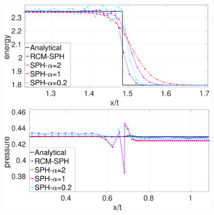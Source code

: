 \begin{figure}
\begin{minipage}{.495 \textwidth}
    \end{minipage}%
    \\
    \begin{minipage}{.495 \textwidth}
        \centering
        \includegraphics[width=0.99 \textwidth]{Chapter-4/Figures/Sod/RCM-Sod-SPH-alf-e-zoom}
    \end{minipage}%
    \begin{minipage}{.495\textwidth}
        \centering
        \includegraphics[width=0.99 \textwidth]{Chapter-4/Figures/Sod/RCM-Sod-SPH-alf-p-zoom}
    \end{minipage}%

\end{figure}

